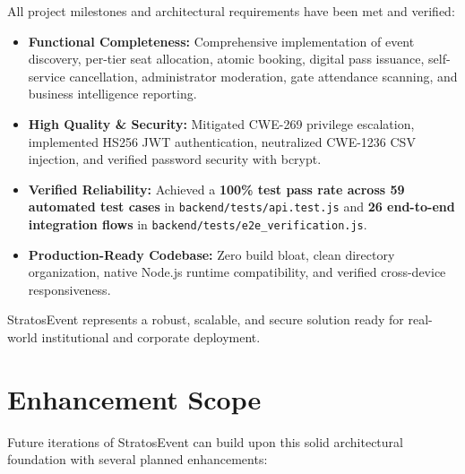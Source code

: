 \documentclass[11pt,a4paper]{article}
\begin{document}
All project milestones and architectural requirements have been met and verified:
\begin{itemize}[leftmargin=*]
    \item \textbf{Functional Completeness:} Comprehensive implementation of event discovery, per-tier seat allocation, atomic booking, digital pass issuance, self-service cancellation, administrator moderation, gate attendance scanning, and business intelligence reporting.
    \item \textbf{High Quality \& Security:} Mitigated CWE-269 privilege escalation, implemented HS256 JWT authentication, neutralized CWE-1236 CSV injection, and verified password security with bcrypt.
    \item \textbf{Verified Reliability:} Achieved a \textbf{100\% test pass rate across 59 automated test cases} in \texttt{backend/tests/api.test.js} and \textbf{26 end-to-end integration flows} in \texttt{backend/tests/e2e\_verification.js}.
    \item \textbf{Production-Ready Codebase:} Zero build bloat, clean directory organization, native Node.js runtime compatibility, and verified cross-device responsiveness.
\end{itemize}

StratosEvent represents a robust, scalable, and secure solution ready for real-world institutional and corporate deployment.

\newpage
\section*{{\color{TitleBlue}\bfseries
\fontsize{18}{22}\selectfont Enhancement Scope}}

\justifying

Future iterations of StratosEvent can build upon this solid architectural foundation with several planned enhancements:
\end{document}
